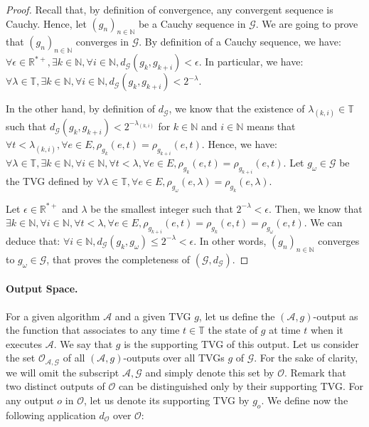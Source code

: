 \documentclass[11pt]{article}
\begin{document}
\begin{proof}
Recall that, by definition of convergence, any convergent sequence is Cauchy. Hence, let $(g_n)_{n\in\mathbb{N}}$ be a Cauchy sequence in $\mathcal{G}$. We are going to prove that $(g_n)_{n\in\mathbb{N}}$ converges in $\mathcal{G}$. By definition of a Cauchy sequence, we have: $\forall \epsilon\in\mathbb{R}^{*+},\exists k\in\mathbb{N}, \forall i\in\mathbb{N}, d_\mathcal{G}(g_{k},g_{k+i})<\epsilon$. In particular, we have: $\forall\lambda\in\mathbb{T},\exists k\in\mathbb{N}, \forall i\in\mathbb{N}, d_\mathcal{G}(g_{k},g_{k+i})<2^{-\lambda}$. 

In the other hand, by definition of $d_\mathcal{G}$, we know that the existence of $\lambda_{(k,i)}\in\mathbb{T}$ such that $d_\mathcal{G}(g_k,g_{k+i})<2^{-\lambda_{(k,i)}}$ for $k\in\mathbb{N}$ and $i\in\mathbb{N}$ means that $\forall t<\lambda_{(k,i)},\forall e\in E,\rho_{g_k}(e,t)=\rho_{g_{k+i}}(e,t)$. Hence, we have:  $\forall\lambda\in\mathbb{T},\exists k\in\mathbb{N}, \forall i\in\mathbb{N},\forall t<\lambda,\forall e\in E,\rho_{g_k}(e,t)=\rho_{g_{k+i}}(e,t)$. Let $g_\omega\in\mathcal{G}$ be the TVG defined by $\forall\lambda\in\mathbb{T},\forall e\in E, \rho_{g_\omega}(e,\lambda)=\rho_{g_{k}}(e,\lambda)$.

 Let $\epsilon\in\mathbb{R}^{*+}$ and $\lambda$ be the smallest integer such that $2^{-\lambda}<\epsilon$. Then, we know that $\exists k\in\mathbb{N},\forall i\in\mathbb{N},\forall t<\lambda,\forall e\in E,\rho_{g_{k+i}}(e,t)=\rho_{g_k}(e,t)=\rho_{g_\omega}(e,t)$. We can deduce that: $\forall i\in\mathbb{N},d_\mathcal{G}(g_k,g_\omega)\leq2^{-\lambda}<\epsilon$. In other words, $(g_n)_{n\in\mathbb{N}}$ converges to $g_\omega\in\mathcal{G}$, that proves the completeness of $(\mathcal{G}, d_\mathcal{G})$.
\end{proof}

\paragraph{Output Space.} For a given algorithm $\mathcal{A}$ and a given TVG $g$, let us define the $(\mathcal{A},g)$-output as the function that associates to any time $t\in\mathbb{T}$ the state of $g$ at time $t$ when it executes $\mathcal{A}$. We say that $g$ is the supporting TVG of this output. Let us consider the set $\mathcal{O}_{\mathcal{A},\mathcal{G}}$ of all $(\mathcal{A},g)$-outputs over all TVGs $g$ of $\mathcal{G}$. For the sake of clarity, we will omit the subscript $\mathcal{A},\mathcal{G}$ and simply denote this set by $\mathcal{O}$. Remark that two distinct outputs of $\mathcal{O}$ can be distinguished only by their supporting TVG. For any output $o$ in $\mathcal{O}$, let us denote its supporting TVG by $g_o$. We define now the following application $d_\mathcal{O}$ over $\mathcal{O}$:
\end{document}
